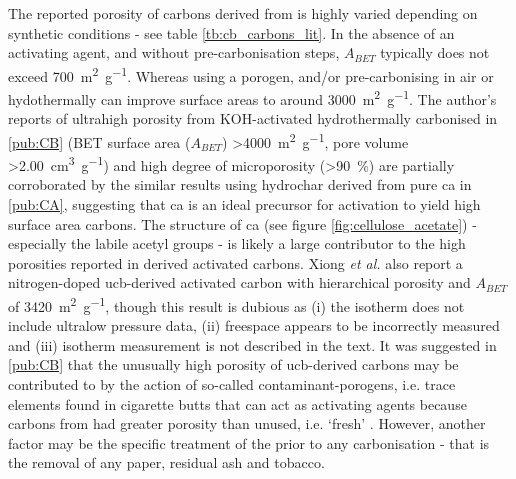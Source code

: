 \begin{sloppypar}
The reported porosity of carbons derived from  is highly varied depending on synthetic conditions - see table \ref{tb:cb_carbons_lit}. In the absence of an \gls{activating agent}, and without pre-carbonisation steps, $A_{BET}$ typically does not exceed \qty{700}{\metre\squared\per\gram}.\citep{Koochaki2019, Soltani2013, Yazdi2012, Lee2014, Hamzah2017} Whereas using a \gls{porogen}, and/or pre-carbonising in air or hydothermally can improve surface areas to around \qty{3000}{\metre\squared\per\gram}.\citep{Xiong2018a, Koochaki2019, Sun2017, Bilge2019} The author's reports of ultrahigh porosity from KOH-activated hydrothermally carbonised  in \ref{pub:CB} (BET surface area ($A_{BET}$) \qty{>4000}{\metre\squared\per\gram}, pore volume \qty{>2.00}{\cm\cubed\per\gram}) and high degree of microporosity (\qty{>90}{\percent}) are partially corroborated by the similar results using hydrochar derived from pure \acrshort{ca} in \ref{pub:CA}, suggesting that \acrshort{ca} is an ideal precursor for activation to yield high surface area carbons. The structure of \acrshort{ca} (see figure \ref{fig:cellulose_acetate}) - especially the labile acetyl groups - is likely a large contributor to the high porosities reported in derived activated carbons. Xiong \textit{et al.} also report a nitrogen-doped \acrshort{ucb}-derived activated carbon with hierarchical porosity and $A_{BET}$ of \qty{3420}{\metre\squared\per\gram}, though this result is dubious as (i) the  isotherm does not include ultralow pressure data, (ii) freespace appears to be incorrectly measured and (iii) isotherm measurement is not described in the text.\citep{xiong2019nitrogen} It was suggested in \ref{pub:CB} that the unusually high porosity of \acrshort{ucb}-derived carbons may be contributed to by the action of so-called contaminant-\glspl{porogen}, i.e. trace elements found in cigarette butts that can act as \glspl{activating agent} because carbons from  had greater porosity than unused, i.e. `fresh' . However, another factor may be the specific treatment of the  prior to any carbonisation - that is the removal of any paper, residual ash and tobacco.
\end{sloppypar}


